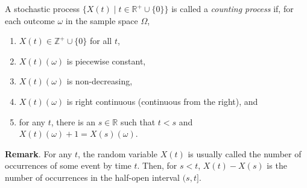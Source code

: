 \documentclass[12pt]{article}
\begin{document}
A stochastic process $\lbrace X(t)\mid t\in
\mathbb{R}^{+}\cup\lbrace 0 \rbrace \rbrace$ is called a
\emph{counting process} if, for each outcome $\omega$ in the sample space $\Omega$,
\begin{enumerate}
\item $X(t)\in \mathbb{Z}^{+}\cup\lbrace 0 \rbrace$ for all $t$,
\item $X(t)(\omega)$ is piecewise constant,
\item $X(t)(\omega)$ is non-decreasing,
\item $X(t)(\omega)$ is right continuous (continuous from the right), and
\item for any $t$, there is an $s\in\mathbb{R}$ such that $t<s$ and $X(t)(\omega)+1=X(s)(\omega)$.
\end{enumerate}

\textbf{Remark}.  For any $t$, the random variable $X(t)$ is usually called the number of occurrences of some event by time $t$.  Then, for $s<t$,
$X(t)-X(s)$ is the number of occurrences in the half-open interval
$(s,t]$.
\end{document}
